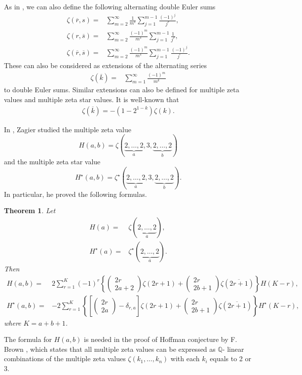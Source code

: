 \documentclass[reqno]{amsart}
\newtheorem{theorem}{Theorem}[section]
\theoremstyle{definition}
\theoremstyle{remark}
\numberwithin{equation}{section}
\begin{document}
As in \cite{6}, we can also define the following alternating double Euler sums
\begin{align}
\zeta(\overline{r},s)=&\sum_{m=2}^{\infty}\frac{1}{m^s}\sum_{j=1}^{m-1}\frac{(-1)^j}{j^r},\label{eq4}\\
\zeta(r, \overline{s})=&\sum_{m=2}^{\infty}\frac{(-1)^m}{m^s}\sum_{j=1}^{m-1}\frac{1}{j^r},\label{eq5}\\
\zeta(\overline{r}, \overline{s})=&\sum_{m=2}^{\infty}\frac{(-1)^m}{m^s}\sum_{j=1}^{m-1}\frac{(-1)^j}{j^r}.\label{eq6}
\end{align}
These can also be considered as extensions of the alternating series
\begin{align*}
\zeta(\overline{k})=&\sum_{m=1}^{\infty}\frac{(-1)^m}{m^k}\end{align*}to double Euler sums. Similar extensions can also be defined for multiple zeta values and multiple zeta star values.
It is well-known that
\begin{align}\label{eq7}\zeta(\overline{k})=-(1-2^{1-k})\zeta(k).\end{align}

In \cite{1}, Zagier studied the multiple zeta value $$H(a, b)=\zeta(\underbrace{2,\ldots,2}_a,3, \underbrace{2,\ldots,2}_b)$$ and the multiple zeta star value
 $$H^{\star}(a, b)=\zeta^{\star}(\underbrace{2,\ldots,2}_a,3, \underbrace{2,\ldots,2}_b).$$In particular, he proved the following formulas.

\begin{theorem}\label{Zagier}
Let
\begin{align*}
H(a)=&\zeta(\underbrace{2,\ldots,2}_a),\\
H^{\star}(a)=&\zeta^{\star}(\underbrace{2,\ldots,2}_a).
 \end{align*}
 Then
\begin{align}
H(a, b)=&2\sum_{r=1}^{K}(-1)^r\left\{\begin{pmatrix} 2r\\2a+2\end{pmatrix}\zeta(2r+1)+\begin{pmatrix} 2r\\2b+1\end{pmatrix}\zeta(\overline{2r+1})\right\}H(K-r),\label{eq8}\\
H^{\star}(a, b)=&-2\sum_{r=1}^{K} \left\{\left[\begin{pmatrix} 2r\\2a\end{pmatrix}-\delta_{r,a}\right]\zeta(2r+1)+\begin{pmatrix} 2r\\2b+1\end{pmatrix}\zeta(\overline{2r+1})\right\}H^{\star}(K-r),\label{eq9}
\end{align}where $K=a+b+1$.
\end{theorem}
The formula for $H(a, b)$ is needed in the proof of Hoffman conjecture by F. Brown \cite{13}, which states that all multiple zeta values can be expressed as $\mathbb{Q}$- linear combinations of the multiple zeta values $\zeta\left(k_1, \ldots, k_n\right)$ with each $k_i$ equals to 2 or 3.
\end{document}
